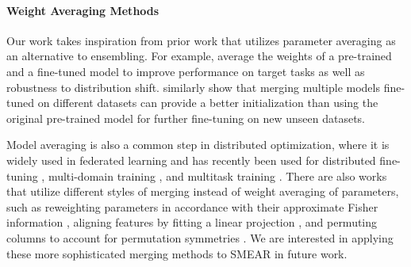\documentclass{article}
\theoremstyle{plain}
\theoremstyle{definition}
\theoremstyle{remark}
\begin{document}
\paragraph{Weight Averaging Methods}
Our work takes inspiration from prior work that utilizes parameter averaging as an alternative to ensembling.
For example, \citet{wortsman2022robust,ilharco2022patching} average the weights of a pre-trained and a fine-tuned model to improve performance on target tasks as well as robustness to distribution shift.
\citet{choshen2022fusing} similarly show that merging multiple models fine-tuned on different datasets can provide a better initialization than using the original pre-trained model for further fine-tuning on new unseen datasets.

Model averaging is also a common step in distributed optimization, where it is widely used in federated learning \citet{mcmahan2017communication} and has recently been used for distributed fine-tuning \citep{wortsman2022fi}, multi-domain training \citep{Li2022BranchTrainMergeEP}, and multitask training \citep{don2022cold}.
There are also works that utilize different styles of merging instead of weight averaging of parameters, such as reweighting parameters in accordance with their approximate Fisher information \citep{matena2021merging}, aligning features by fitting a linear projection \citep{jin2022dataless}, and permuting columns to account for permutation symmetries \citep{ainsworth2022git}.
We are interested in applying these more sophisticated merging methods to SMEAR in future work.

\end{document}
